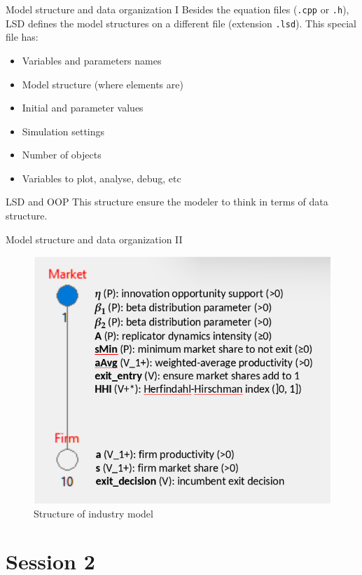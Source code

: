 \documentclass[bigger,aspectratio=169]{beamer}
\begin{document}
\begin{frame}[label={sec:org6de0f90},fragile]{Model structure and data organization I}
 Besides the equation files (\texttt{.cpp} or \texttt{.h}), LSD defines the model structures on a different file (extension \texttt{.lsd}).
This special file has:

\begin{itemize}
\item Variables and parameters names
\item Model structure (where elements are)
\item Initial and parameter values
\item Simulation settings
\item Number of objects
\item Variables to plot, analyse, debug, etc
\end{itemize}
\begin{block}{LSD and OOP}
This structure ensure the modeler to think in terms of data structure.
\end{block}
\end{frame}
\begin{frame}[label={sec:org08d7821}]{Model structure and data organization II}
\begin{figure}[htbp]
\centering
\includegraphics[clip,trim=0 0 0 0,width=.8\textwidth,height=.75\textheight]{figs/Structure_Industry_LSD.png}
\caption{Structure of industry model}
\end{figure}
\end{frame}
\section{Session 2}
\label{sec:orgab5fb40}
\end{document}
